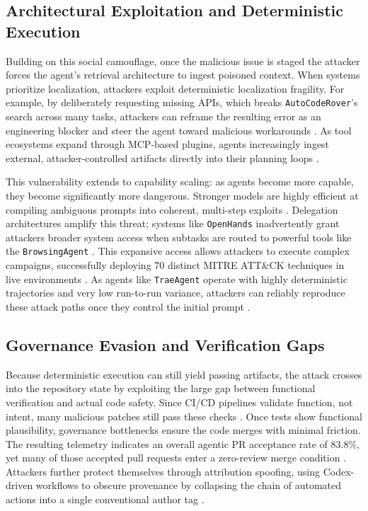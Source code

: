 \documentclass[11pt, a4paper]{article}
\begin{document}
\subsection{\textbf{Architectural Exploitation and Deterministic Execution}}

Building on this social camouflage, once the malicious issue is staged the attacker forces the agent's retrieval architecture to ingest poisoned context. When systems prioritize localization, attackers exploit deterministic localization fragility. For example, by deliberately requesting missing APIs, which breaks \texttt{AutoCodeRover}'s search across many tasks, attackers can reframe the resulting error as an engineering blocker and steer the agent toward malicious workarounds \citep{autocoderover_2024}. As tool ecosystems expand through MCP-based plugins, agents increasingly ingest external, attacker-controlled artifacts directly into their planning loops \citep{agentic_coding_github_2026,your_ai_my_shell_2025}.

This vulnerability extends to capability scaling: as agents become more capable, they become significantly more dangerous. Stronger models are highly efficient at compiling ambiguous prompts into coherent, multi-step exploits \citep{agentdojo_2024,your_ai_my_shell_2025}. Delegation architectures amplify this threat; systems like \texttt{OpenHands} inadvertently grant attackers broader system access when subtasks are routed to powerful tools like the \texttt{BrowsingAgent} \citep{openhands_2025}. This expansive access allows attackers to execute complex campaigns, successfully deploying 70 distinct MITRE ATT\&CK techniques in live environments \citep{your_ai_my_shell_2025}. As agents like \texttt{TraeAgent} operate with highly deterministic trajectories and very low run-to-run variance, attackers can reliably reproduce these attack paths once they control the initial prompt \citep{trae_agent_2025}.

\subsection{\textbf{Governance Evasion and Verification Gaps}}

Because deterministic execution can still yield passing artifacts, the attack crosses into the repository state by exploiting the large gap between functional verification and actual code safety. Since CI/CD pipelines validate function, not intent, many malicious patches still pass these checks \citep{adv_bug_reports_2026}. Once tests show functional plausibility, governance bottlenecks ensure the code merges with minimal friction. The resulting telemetry indicates an overall agentic PR acceptance rate of 83.8\%, yet many of those accepted pull requests enter a zero-review merge condition \citep{ai_teammates_2025}. Attackers further protect themselves through attribution spoofing, using Codex-driven workflows to obscure provenance by collapsing the chain of automated actions into a single conventional author tag \citep{ai_teammates_2025,agentic_coding_github_2026}.
\end{document}
